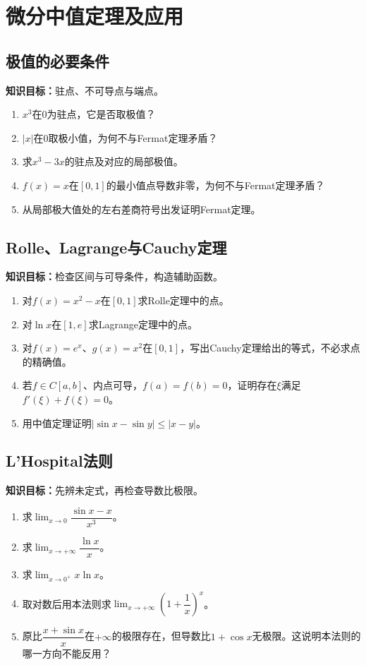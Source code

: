 \documentclass[11pt,a4paper,fontset=fandol]{ctexrep}
\newcommand{\goal}[1]{\textbf{知识目标：}#1\par}
\begin{document}
\section{微分中值定理及应用}
\subsection{极值的必要条件}
\goal{驻点、不可导点与端点。}
\begin{enumerate}
\item $x^3$在0为驻点，它是否取极值？
\item $|x|$在0取极小值，为何不与Fermat定理矛盾？
\item 求$x^3-3x$的驻点及对应的局部极值。
\item $f(x)=x$在$[0,1]$的最小值点导数非零，为何不与Fermat定理矛盾？
\item 从局部极大值处的左右差商符号出发证明Fermat定理。
\end{enumerate}
\subsection{Rolle、Lagrange与Cauchy定理}
\goal{检查区间与可导条件，构造辅助函数。}
\begin{enumerate}
\item 对$f(x)=x^2-x$在$[0,1]$求Rolle定理中的点。
\item 对$\ln x$在$[1,e]$求Lagrange定理中的点。
\item 对$f(x)=e^x$、$g(x)=x^2$在$[0,1]$，写出Cauchy定理给出的等式，不必求点的精确值。
\item 若$f\in C[a,b]$、内点可导，$f(a)=f(b)=0$，证明存在$\xi$满足$f'(\xi)+f(\xi)=0$。
\item 用中值定理证明$|\sin x-\sin y|\le|x-y|$。
\end{enumerate}
\subsection{L'Hospital法则}
\goal{先辨未定式，再检查导数比极限。}
\begin{enumerate}
\item 求$\lim_{x\to0}\dfrac{\sin x-x}{x^3}$。
\item 求$\lim_{x\to+\infty}\dfrac{\ln x}{x}$。
\item 求$\lim_{x\to0^+}x\ln x$。
\item 取对数后用本法则求$\lim_{x\to+\infty}\left(1+\dfrac{1}{x}\right)^x$。
\item 原比$\dfrac{x+\sin x}{x}$在$+\infty$的极限存在，但导数比$1+\cos x$无极限。这说明本法则的哪一方向不能反用？
\end{enumerate}
\end{document}
